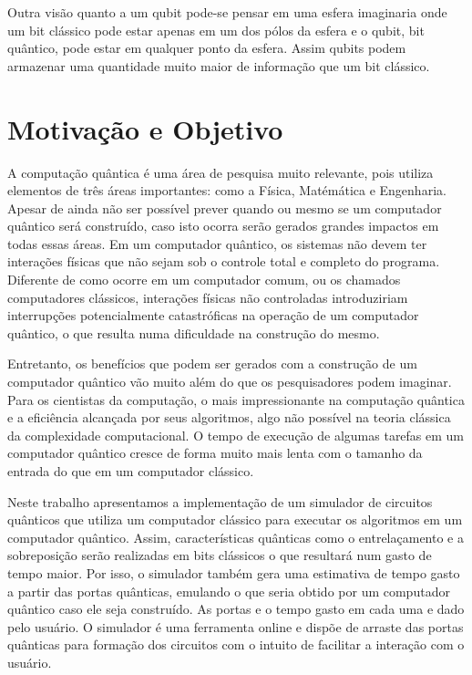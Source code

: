 \documentclass[a4paper, 12pt, oneside]{book}
\begin{document}
Outra visão quanto a um qubit pode-se pensar em uma esfera imaginaria onde um bit clássico pode estar apenas em um dos pólos da esfera e o qubit, bit quântico, pode estar em qualquer ponto da esfera. Assim qubits podem armazenar uma quantidade muito maior de informação que um bit clássico.

\section{Motivação e Objetivo}

A computação quântica é uma área de pesquisa muito relevante, pois utiliza elementos de três áreas importantes: como a Física, Matémática e Engenharia. Apesar de ainda não ser possível prever quando ou mesmo se um computador quântico será construído, caso isto ocorra serão gerados grandes impactos em todas essas áreas. Em um computador quântico, os sistemas não devem ter interações físicas que não sejam sob o controle total e completo do programa. Diferente de como ocorre em um computador comum, ou os chamados computadores clássicos, interações físicas não controladas introduziriam interrupções potencialmente catastróficas na operação de um computador quântico, o que resulta numa dificuldade na construção do mesmo. 

Entretanto, os benefícios que podem ser gerados com a construção de um computador quântico vão muito além do que os pesquisadores podem imaginar. Para os cientistas da computação, o mais impressionante na computação quântica e a eficiência alcançada por seus algoritmos, algo não possível na teoria clássica da complexidade computacional. O tempo de execução de algumas tarefas em um computador quântico cresce de forma muito mais lenta com o tamanho da entrada do que em um computador clássico. 

Neste trabalho apresentamos a implementação de um simulador de circuitos quânticos que utiliza um computador clássico para executar os algoritmos em um computador quântico. Assim, características quânticas como o entrelaçamento e a sobreposição serão realizadas em bits clássicos o que resultará num gasto de tempo maior. Por isso, o simulador também gera uma estimativa de tempo gasto a partir das portas quânticas, emulando o que seria obtido por um computador quântico caso ele seja construído. As portas e o tempo gasto em cada uma e dado pelo usuário. O simulador é uma ferramenta online e dispõe de arraste das portas quânticas para formação dos circuitos com o intuito de facilitar a interação com o usuário.
\end{document}
